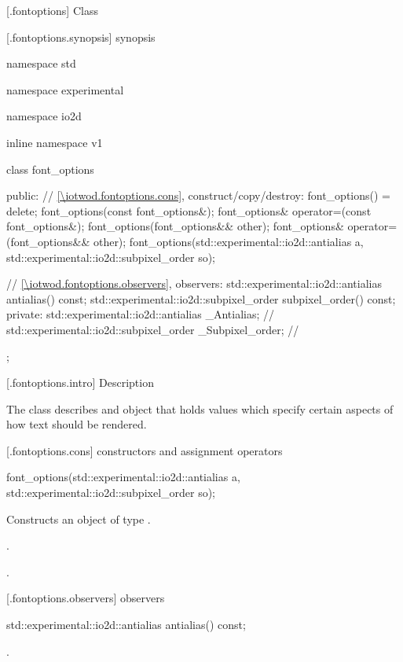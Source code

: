  [\iotwod.fontoptions] {Class }

 [\iotwod.fontoptions.synopsis] { synopsis}

\begin{codeblock}
namespace std { namespace experimental { namespace io2d { inline namespace v1 {
  class font_options {
    public:
    // \ref{\iotwod.fontoptions.cons}, construct/copy/destroy:
    font_options() = delete;
    font_options(const font_options&);
    font_options& operator=(const font_options&);
    font_options(font_options&& other);
    font_options& operator=(font_options&& other);
    font_options(std::experimental::io2d::antialias a,
      std::experimental::io2d::subpixel_order so);

    // \ref{\iotwod.fontoptions.observers}, observers:
    std::experimental::io2d::antialias antialias() const;
    std::experimental::io2d::subpixel_order subpixel_order() const;
  private:
    std::experimental::io2d::antialias _Antialias;           // \expos
    std::experimental::io2d::subpixel_order _Subpixel_order; // \expos
  };
} } } }
\end{codeblock}

 [\iotwod.fontoptions.intro] { Description}

\pnum
{}
The  class describes and object that holds values which specify certain aspects of how text should be rendered.

 [\iotwod.fontoptions.cons] { constructors and assignment operators}

\begin{itemdecl}
    font_options(std::experimental::io2d::antialias a,
      std::experimental::io2d::subpixel_order so);
\end{itemdecl}
\begin{itemdescr}
	\pnum
	\effects
	Constructs an object of type .
	
	\pnum
	\postconditions
	.
	
	.
	
\end{itemdescr}

 [\iotwod.fontoptions.observers] { observers}

\begin{itemdecl}
std::experimental::io2d::antialias antialias() const;
\end{itemdecl}
\begin{itemdescr}
	\pnum
	\returns
	.

\end{itemdescr}

